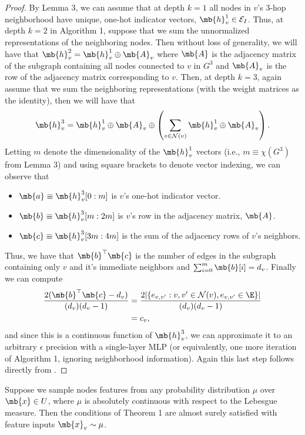 \begin{proof}
By Lemma 3, we can assume that at depth $k=1$ all nodes in $v$'s 3-hop neighborhood have unique, one-hot indicator vectors, $\mb{h}^1_v \in \mathcal{E}_I$. 
Thus, at depth $k=2$ in Algorithm 1, suppose that we sum the unnormalized representations of the neighboring nodes. Then without loss of generality, we will have that $\mb{h}^{2}_v = \mb{h}^1_v \oplus \mb{A}_{v}$ where $\mb{A}$ is the adjacency matrix of the subgraph containing all nodes connected to $v$ in $G^3$ and $\mb{A}_v$ is the row of the adjacency matrix corresponding to $v$. 
Then, at depth $k=3$, again assume that we sum the neighboring representations (with the weight matrices as the identity), then we will have that 
\begin{equation}
\mb{h}_v^3 = \mb{h}^1_v \oplus \mb{A}_{v} \oplus \left(\sum_{v \in \mathcal{N}(v)} \mb{h}^1_v \oplus \mb{A}_{v}\right).
\end{equation}
Letting $m$ denote the dimensionality of the $\mb{h}^1_v$ vectors (i.e., $m \equiv \chi(G^3)$ from Lemma 3) and using square brackets to denote vector indexing, we can observe that
\begin{itemize}
\item
	$\mb{a} \equiv \mb{h}^3_v[0:m]$ is $v$'s one-hot indicator vector. 
\item
	$\mb{b} \equiv \mb{h}^3_v[m:2m]$ is $v$'s row in the adjacency matrix, $\mb{A}$.
\item
	$\mb{c} \equiv \mb{h}^3_v[3m:4m]$ is the sum of the adjacency rows of $v$'s neighbors. 
\end{itemize}

Thus, we have that $\mb{b}^\top\mb{c}$ is the number of edges in the subgraph containing only $v$ and it's immediate neighbors and $\sum_{i=0}^{m}\mb{b}[i] = d_v$.
Finally we can compute
\begin{align}
\frac{2(\mb{b}^\top\mb{c} - d_v)}{(d_v)(d_v - 1)}  &= \frac{2 | \{ e_{v,v'} : v, v' \in \mathcal{N}(v), e_{v,v'} \in \E \}|}{(d_v)(d_v - 1)}\\
&=c_v,
\end{align}
and since this is a continuous function of $\mb{h}^{3}_v$, we can approximate it to an arbitrary $\epsilon$ precision with a single-layer MLP (or equivalently, one more iteration of Algorithm 1, ignoring neighborhood information). 
Again this last step follows directly from \cite{hornik1991approximation}.
\end{proof}

\renewcommand{\thetheorem}{2}
\begin{corollary}
Suppose we sample nodes features from any probability distribution $\mu$ over $\mb{x} \in U$, where $\mu$ is absolutely continuous with respect to the Lebesgue measure. Then the conditions of Theorem 1 are almost surely satisfied with feature inputs $\mb{x}_v \sim \mu$. 
\end{corollary}

